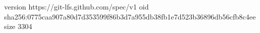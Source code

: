 version https://git-lfs.github.com/spec/v1
oid sha256:0775caa907a80d7d353599f86b3d7a955db38fb1e7d523b36896db56cfb8c4ee
size 3304
